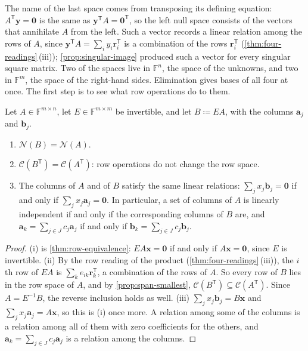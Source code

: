 The name of the last space comes from transposing its defining equation: $A^{\mathsf T}\mathbf y=\mathbf 0$ is the same as $\mathbf y^{\mathsf T}A=\mathbf 0^{\mathsf T}$, so the left null space consists of the vectors that annihilate $A$ from the left. Such a vector records a linear relation among the rows of $A$, since $\mathbf y^{\mathsf T}A=\sum_iy_i\mathbf r_i^{\mathsf T}$ is a combination of the rows $\mathbf r_i^{\mathsf T}$ (\cref{thm:four-readings}\,(iii)); \cref{prop:singular-image} produced such a vector for every singular square matrix. Two of the spaces live in $\mathbb F^n$, the space of the unknowns, and two in $\mathbb F^m$, the space of the right-hand sides. Elimination gives bases of all four at once. The first step is to see what row operations do to them.

\begin{lemma}
\label{lem:row-operations-subspaces}
Let $A\in\mathbb F^{m\times n}$, let $E\in\mathbb F^{m\times m}$ be invertible, and let $B\coloneqq EA$, with the columns $\mathbf a_j$ and $\mathbf b_j$.
\begin{enumerate}
\item $\mathcal N(B)=\mathcal N(A)$.
\item $\mathcal C(B^{\mathsf T})=\mathcal C(A^{\mathsf T})$: row operations do not change the row space.
\item The columns of $A$ and of $B$ satisfy the same linear relations: $\sum_jx_j\mathbf b_j=\mathbf 0$ if and only if $\sum_jx_j\mathbf a_j=\mathbf 0$. In particular, a set of columns of $A$ is linearly independent if and only if the corresponding columns of $B$ are, and $\mathbf a_k=\sum_{j\in J}c_j\mathbf a_j$ if and only if $\mathbf b_k=\sum_{j\in J}c_j\mathbf b_j$.
\end{enumerate}
\end{lemma}

\begin{proof}
(i) is \cref{thm:row-equivalence}: $EA\mathbf x=\mathbf 0$ if and only if $A\mathbf x=\mathbf 0$, since $E$ is invertible. (ii) By the row reading of the product (\cref{thm:four-readings}\,(iii)), the $i$th row of $EA$ is $\sum_ke_{ik}\mathbf r_k^{\mathsf T}$, a combination of the rows of $A$. So every row of $B$ lies in the row space of $A$, and by \cref{prop:span-smallest}, $\mathcal C(B^{\mathsf T})\subseteq\mathcal C(A^{\mathsf T})$. Since $A=E^{-1}B$, the reverse inclusion holds as well. (iii) $\sum_jx_j\mathbf b_j=B\mathbf x$ and $\sum_jx_j\mathbf a_j=A\mathbf x$, so this is (i) once more. A relation among some of the columns is a relation among all of them with zero coefficients for the others, and $\mathbf a_k=\sum_{j\in J}c_j\mathbf a_j$ is a relation among the columns.
\end{proof}


